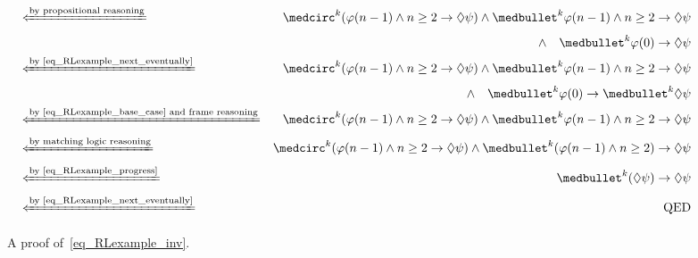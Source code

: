 \documentclass{amsart}
\begin{document}
\begin{figure}
{\begin{align*}
\\
&\xif{by propositional reasoning}&
\wnext^k  (\varphi(n-1) \wedge n \ge 2 \imp \eventually \psi)
\wedge \snext^k \varphi(n-1) \wedge n \ge 2 \imp \eventually \psi
\\&&
\wedge\quad
\snext^k \varphi(0) \imp \eventually \psi
\\
&\xif{by~\eqref{eq_RLexample_next_eventually}}&
\wnext^k  (\varphi(n-1) \wedge n \ge 2 \imp \eventually \psi)
\wedge \snext^k \varphi(n-1) \wedge n \ge 2 \imp \eventually \psi
\\&&
\wedge\quad
\snext^k \varphi(0) \imp \snext^k \eventually \psi
\\
&\xif{by~\eqref{eq_RLexample_base_case} and frame reasoning}&
\wnext^k  (\varphi(n-1) \wedge n \ge 2 \imp \eventually \psi)
\wedge \snext^k \varphi(n-1) \wedge n \ge 2 \imp \eventually \psi
\\
&\xif{by matching logic reasoning}&
\wnext^k  (\varphi(n-1) \wedge n \ge 2 \imp \eventually \psi)
\wedge \snext^k (\varphi(n-1) \wedge n \ge 2) \imp \eventually \psi
\\
&\xif{by~\eqref{eq_RLexample_progress}}&
\snext^k  (\eventually \psi) \imp \eventually \psi
\\
&\xif{by~\eqref{eq_RLexample_next_eventually}}&
\QED
\end{align*}
}
\caption{A proof of~\eqref{eq_RLexample_inv}.}
\label{fig_RLexample_proof}
\end{figure}
\end{document}
